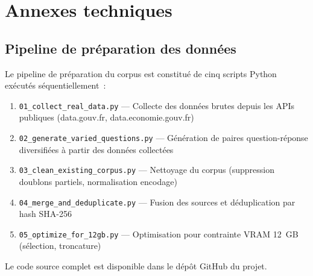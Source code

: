 \documentclass[12pt,a4paper,twoside]{report}
\newcommand{\code}[1]{\texttt{#1}}
\begin{document}
\cleardoublepage
{}












\appendix
\chapter{Annexes techniques}

\section{Pipeline de préparation des données}

Le pipeline de préparation du corpus est constitué de cinq scripts Python exécutés séquentiellement~:

\begin{enumerate}
    \item \code{01\_collect\_real\_data.py} --- Collecte des données brutes depuis les APIs publiques (data.gouv.fr, data.economie.gouv.fr)
    \item \code{02\_generate\_varied\_questions.py} --- Génération de paires question-réponse diversifiées à partir des données collectées
    \item \code{03\_clean\_existing\_corpus.py} --- Nettoyage du corpus (suppression doublons partiels, normalisation encodage)
    \item \code{04\_merge\_and\_deduplicate.py} --- Fusion des sources et déduplication par hash SHA-256
    \item \code{05\_optimize\_for\_12gb.py} --- Optimisation pour contrainte VRAM 12~GB (sélection, troncature)
\end{enumerate}

Le code source complet est disponible dans le dépôt GitHub du projet.
\end{document}

